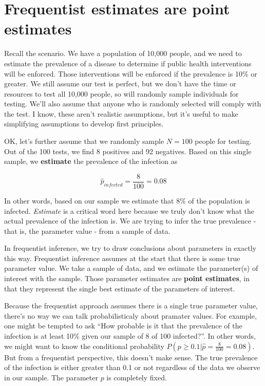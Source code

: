 \documentclass[
]{book}
\begin{document}
\section{Frequentist estimates are point estimates}\label{frequentist-estimates-are-point-estimates}

Recall the scenario. We have a population of 10,000 people, and we need to estimate the prevalence of a disease to determine if public health interventions will be enforced. Those interventions will be enforced if the prevalence is 10\% or greater. We still assume our test is perfect, but we don't have the time or resources to test all 10,000 people, so will randomly sample individuals for testing. We'll also assume that anyone who is randomly selected will comply with the test. I know, these aren't realistic assumptions, but it's useful to make simplifying assumptions to develop first principles.

OK, let's further assume that we randomly sample \(N = 100\) people for testing. Out of the 100 tests, we find 8 positives and 92 negatives. Based on this single sample, we \textbf{estimate} the prevalence of the infection as

\[
\hat{p}_{infected}=\frac{8}{100}=0.08
\]

In other words, based on our sample we estimate that 8\% of the population is infected. \emph{Estimate} is a critical word here because we truly don't know what the actual prevalence of the infection is. We are trying to infer the true prevalence - that is, the parameter value - from a sample of data.

In frequentist inference, we try to draw conclusions about parameters in exactly this way. Frequentist inference assumes at the start that there is some true parameter value. We take a sample of data, and we estimate the parameter(s) of interest with the sample. Those parameter estimates are \textbf{point estimates}, in that they represent the single best estimate of the parameters of interest.

Because the frequentist approach assumes there is a single true parameter value, there's no way we can talk probabilisticaly about pramater values. For example, one might be tempted to ask ``How probable is it that the prevalence of the infection is at least 10\% given our sample of 8 of 100 infected?''. In other words, we might want to know the conditional probability \(P(p\geq0.1|\hat{p}=\frac{8}{100}=0.08)\). But from a frequentist perspective, this doesn't make sense. The true prevalence of the infection is either greater than 0.1 or not regardless of the data we observe in our sample. The parameter \(p\) is completely fixed.
\end{document}

